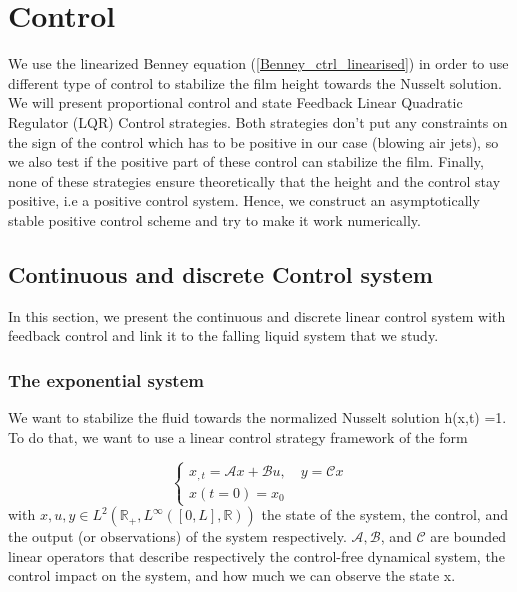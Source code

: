 \documentclass[12pt]{article}
\begin{document}
\section{Control}\label{Section_Control}
We use the linearized Benney equation (\ref{Benney_ctrl_linearised}) in order to use different type of control to stabilize the film height towards the Nusselt solution. We will present proportional control and state Feedback Linear Quadratic Regulator (LQR) Control strategies. Both strategies don't put any constraints on the sign of the control which has to be positive in our case (blowing air jets), so we also test if the positive part of these control can stabilize the film. Finally, none of these strategies ensure theoretically that the height and the control stay positive, i.e a positive control system. Hence, we construct an asymptotically stable positive control scheme and try to make it work numerically.  



\subsection{Continuous and discrete Control system }
In this section, we present the continuous and discrete linear control system with feedback control and link it to the falling liquid system that we study.

\subsubsection{The exponential system}
We want to stabilize the fluid towards the normalized Nusselt solution h(x,t) =1. To do that, we want to use a linear control strategy framework of the form

\begin{equation}\label{Ctrl_framework_continuous}
    \left\{ 
    \begin{aligned}
        x_{,t} = \mathcal{A}x+\mathcal{B}u, \quad y=\mathcal{C}x\\
        x(t=0) = x_0
    \end{aligned}
    \right.
\end{equation}
with $x, u, y\in L^{2}(\mathbb{R}_+, L^{\infty}([0,L],\mathbb{R}))$ the state of the system, the control, and the output (or observations) of the system respectively. $\mathcal{A}, \mathcal{B}$, and $\mathcal{C}$ are bounded linear operators that describe respectively the control-free dynamical system, the control impact on the system, and how much we can observe the state x.
\\ 
\end{document}
